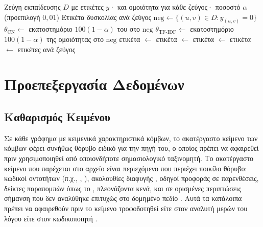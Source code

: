 \begin{algorithm}[h!]
\caption{Πρωτόκολλο Χαρακτηρισμού Δυσκολίας}
\label{alg:difficulty}
\begin{algorithmic}[1]
\Require Ζεύγη εκπαίδευσης $D$ με ετικέτες $y$·  και ομοιότητα 
    για κάθε ζεύγος· ποσοστό $\alpha$ (προεπιλογή $0{,}01$)
\Ensure Ετικέτα δυσκολίας ανά ζεύγος
\State $\text{neg} \gets \{(u,v) \in D : y_{(u,v)} = 0\}$
\State $\theta_{\mathrm{CN}} \gets$ εκατοστημόριο $100(1-\alpha)$ του  στο $\text{neg}$
\State $\theta_{\mathrm{TF\text{-}IDF}} \gets$ εκατοστημόριο $100(1-\alpha)$ της ομοιότητας  στο $\text{neg}$
        \State ετικέτα $\gets$ 
        \State ετικέτα $\gets$ 
        \State ετικέτα $\gets$ 
    \Else
        \State ετικέτα $\gets$ 
    \EndIf
\EndFor
\State \Return ετικέτες ανά ζεύγος
\end{algorithmic}
\end{algorithm}


\section{Προεπεξεργασία Δεδομένων}
\label{sec:preprocessing}

\subsection{Καθαρισμός Κειμένου}
\label{subsec:text-cleaning}

Σε κάθε γράφημα με κειμενικά χαρακτηριστικά κόμβων, το ακατέργαστο κείμενο των
κόμβων φέρει συνήθως θόρυβο ειδικό για την πηγή του, ο οποίος πρέπει να αφαιρεθεί
πριν χρησιμοποιηθεί από οποιονδήποτε σημασιολογικό ταξινομητή.
Το ακατέργαστο κείμενο που παρέχεται στο αρχείο \texttt{} είναι
περιεχόμενο  που περιέχει ποικίλο θόρυβο: κωδικοί οντοτήτων 
(π.χ., \texttt{}, \texttt{}), ακολουθίες διαφυγής ,
οδηγοί προφοράς σε παρενθέσεις, δείκτες παραπομπών όπως το \texttt{\en{[1]}},
πλεονάζοντα κενά, και σε ορισμένες περιπτώσεις σήμανση  που δεν
αναλύθηκε επιτυχώς στο δομημένο πεδίο .
Αυτά τα κατάλοιπα πρέπει να
αφαιρεθούν πριν το κείμενο τροφοδοτηθεί είτε στον αναλυτή μερών του λόγου είτε στον
κωδικοποιητή .

